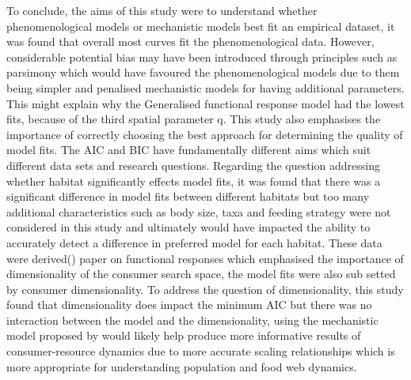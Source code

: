 \documentclass[11pt]{article}
\begin{document}
To conclude, the aims of this study were to understand whether phenomenological models or mechanistic models best fit an empirical dataset, it was found that overall most curves fit the phenomenological data. However, considerable potential bias may have been introduced through principles such as parsimony which would have favoured the phenomenological models due to them being simpler and penalised mechanistic models for having additional parameters. This might explain why the Generalised functional response model had the lowest fits, because of the third spatial parameter q. This study also emphasises the importance of correctly choosing the best approach for determining the quality of model fits. The AIC and BIC have fundamentally different aims which suit different data sets and research questions. Regarding the question addressing whether habitat significantly effects model fits, it was found that there was a significant difference in model fits between different habitats but too many additional characteristics such as body size, taxa and feeding strategy were not considered in this study and ultimately would have impacted the ability to accurately detect a difference in preferred model for each habitat. These data were derived(\cite{Pawar2012}) paper on functional responses which emphasised the importance of dimensionality of the consumer search space, the model fits were also sub setted by consumer dimensionality. To address the question of dimensionality, this study found that dimensionality does impact the minimum AIC but there was no interaction between the model and the dimensionality, using the mechanistic model proposed by \cite{Pawar2012} would likely help produce more informative results of consumer-resource dynamics due to more accurate scaling relationships which is more appropriate for understanding population and food web dynamics. 
	
\newpage


\vspace*{1\baselineskip}
\printbibliography 


\newpage
\end{document}
